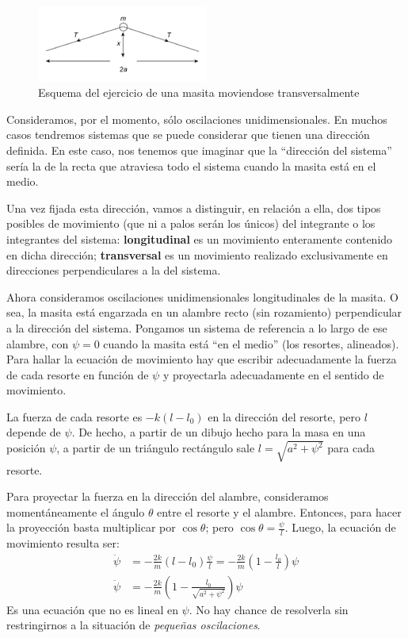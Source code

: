 \documentclass[a4paper,spanish]{article}
\numberwithin{equation}{section}
\begin{document}
\begin{figure}[H]
  \centering
  \includegraphics[width=0.5\textwidth]{Imagenes/transversal.png}
  \caption{Esquema del ejercicio de una masita moviendose transversalmente}
 \label{fig:masita_transversal}
\end{figure}

Consideramos, por el momento, sólo oscilaciones unidimensionales. En muchos casos tendremos sistemas que se puede considerar que tienen una dirección definida. En este caso, nos tenemos que imaginar que la ``dirección del sistema'' sería la de la recta que atraviesa todo el sistema cuando la masita está en el medio.

Una vez fijada esta dirección, vamos a distinguir, en relación a ella, dos tipos posibles de movimiento (que ni a palos serán los únicos) del integrante o los integrantes del sistema: \textbf{longitudinal} es un movimiento enteramente contenido en dicha dirección; \textbf{transversal} es un movimiento realizado exclusivamente en direcciones perpendiculares a la del sistema.

Ahora consideramos oscilaciones unidimensionales longitudinales de la masita. O sea, la masita está engarzada en un alambre recto (sin rozamiento) perpendicular a la dirección del sistema. Pongamos un sistema de referencia a lo largo de ese alambre, con $\psi=0$ cuando la masita está ``en el medio'' (los resortes, alineados). Para hallar la ecuación de movimiento hay que escribir adecuadamente la fuerza de cada resorte en función de $\psi$ y proyectarla adecuadamente en el sentido de movimiento.

La fuerza de cada resorte es $-k(l-l_0)$ en la dirección del resorte, pero $l$ depende de $\psi$. De hecho, a partir de un dibujo hecho para la masa en una posición $\psi$, a partir de un triángulo rectángulo sale $l = \sqrt{a^2+\psi^2}$ para cada resorte.

Para proyectar la fuerza en la dirección del alambre, consideramos momentáneamente el ángulo $\theta$ entre el resorte y el alambre. Entonces, para hacer la proyección basta multiplicar por $\cos{\theta}$; pero $\cos{\theta}=\frac{\psi}{l}$. Luego, la ecuación de movimiento resulta ser:
		\begin{align*}
			\ddot{\psi} &= -\frac{2k}{m}(l-l_0)\frac{\psi}{l} 
				= -\frac{2k}{m} \left(1-\frac{l_0}{l}\right) \psi\\
			\ddot{\psi} &= -\frac{2k}{m} \left(1-\frac{l_0}{\sqrt{a^2+\psi^2}}\right) \psi
		\end{align*}
Es una ecuación que no es lineal en $\psi$. No hay chance de resolverla sin restringirnos a la situación de \textit{pequeñas oscilaciones}.
\end{document}
